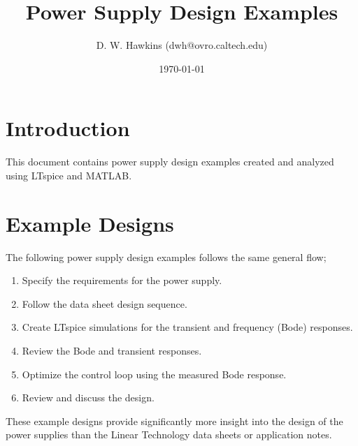 \documentclass[10pt,twoside]{article}
\begin{document}
\title{Power Supply Design Examples}
\author{D. W. Hawkins (dwh@ovro.caltech.edu)}
\date{\today}
\maketitle

\thispagestyle{empty}

\tableofcontents

\cleardoublepage

\pagestyle{fancy}
\chead{}
\rhead{\today}
\lfoot{}
\cfoot{}
\rfoot{\thepage}
\renewcommand{\headrulewidth}{0.4pt}
\renewcommand{\footrulewidth}{0.4pt}

\lstset{language=Tcl}

\section{Introduction}

This document contains power supply design examples created
and analyzed using LTspice and MATLAB.

\section{Example Designs}

The following power supply design examples follows the same
general flow;
%
\begin{enumerate}
\item Specify the requirements for the power supply.
\item Follow the data sheet design sequence.
\item Create LTspice simulations for the transient and
frequency (Bode) responses.
\item Review the Bode and transient responses.
\item Optimize the control loop using the measured Bode response.
\item Review and discuss the design.
\end{enumerate}
%
These example designs provide significantly more insight into
the design of the power supplies than the Linear Technology
data sheets or application notes.
\end{document}
